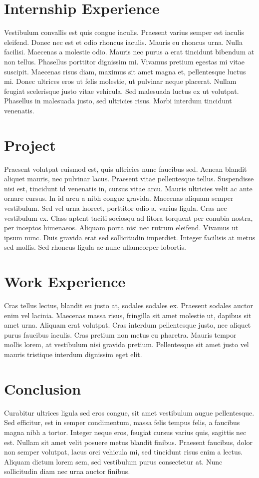 \documentclass[12pt, letterpaper]{article}
\begin{document}
\section*{Internship Experience}
Vestibulum convallis est quis congue iaculis. Praesent varius semper est iaculis eleifend. Donec nec est et odio rhoncus iaculis. Mauris eu rhoncus urna. Nulla facilisi. Maecenas a molestie odio. Mauris nec purus a erat tincidunt bibendum at non tellus. Phasellus porttitor dignissim mi. Vivamus pretium egestas mi vitae suscipit. Maecenas risus diam, maximus sit amet magna et, pellentesque luctus mi. Donec ultrices eros ut felis molestie, ut pulvinar neque placerat. Nullam feugiat scelerisque justo vitae vehicula. Sed malesuada luctus ex ut volutpat. Phasellus in malesuada justo, sed ultricies risus. Morbi interdum tincidunt venenatis.

\section*{Project}
Praesent volutpat euismod est, quis ultricies nunc faucibus sed. Aenean blandit aliquet mauris, nec pulvinar lacus. Praesent vitae pellentesque tellus. Suspendisse nisi est, tincidunt id venenatis in, cursus vitae arcu. Mauris ultricies velit ac ante ornare cursus. In id arcu a nibh congue gravida. Maecenas aliquam semper vestibulum. Sed vel urna laoreet, porttitor odio a, varius ligula. Cras nec vestibulum ex. Class aptent taciti sociosqu ad litora torquent per conubia nostra, per inceptos himenaeos. Aliquam porta nisi nec rutrum eleifend. Vivamus ut ipsum nunc. Duis gravida erat sed sollicitudin imperdiet. Integer facilisis at metus sed mollis. Sed rhoncus ligula ac nunc ullamcorper lobortis.

\section*{Work Experience}
Cras tellus lectus, blandit eu justo at, sodales sodales ex. Praesent sodales auctor enim vel lacinia. Maecenas massa risus, fringilla sit amet molestie ut, dapibus sit amet urna. Aliquam erat volutpat. Cras interdum pellentesque justo, nec aliquet purus faucibus iaculis. Cras pretium non metus eu pharetra. Mauris tempor mollis lorem, at vestibulum nisi gravida pretium. Pellentesque sit amet justo vel mauris tristique interdum dignissim eget elit.

\section*{Conclusion}
Curabitur ultrices ligula sed eros congue, sit amet vestibulum augue pellentesque. Sed efficitur, est in semper condimentum, massa felis tempus felis, a faucibus magna nibh a tortor. Integer neque eros, feugiat cursus varius quis, sagittis nec est. Nullam sit amet velit posuere metus blandit finibus. Praesent faucibus, dolor non semper volutpat, lacus orci vehicula mi, sed tincidunt risus enim a lectus. Aliquam dictum lorem sem, sed vestibulum purus consectetur at. Nunc sollicitudin diam nec urna auctor finibus.
\end{document}
